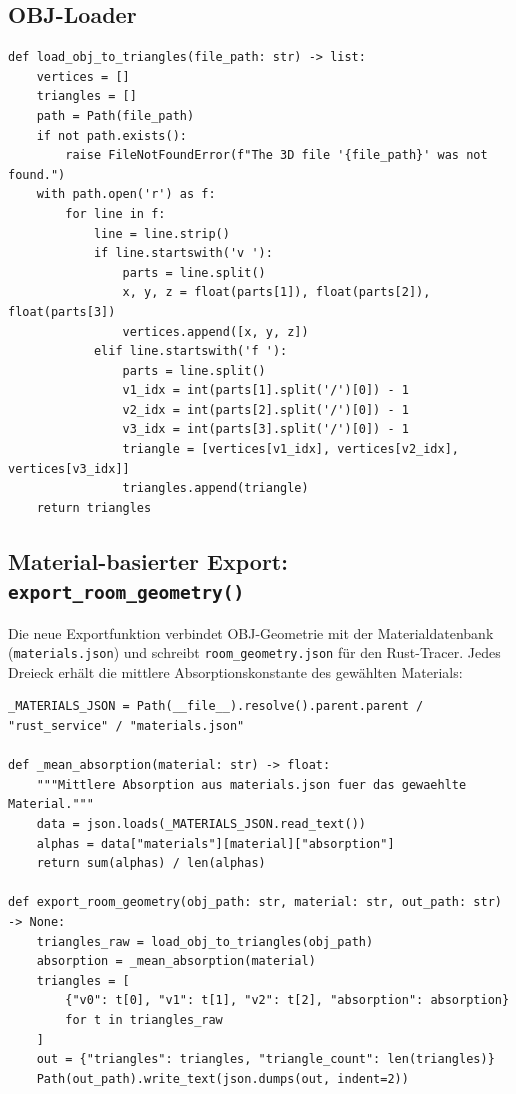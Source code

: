 \documentclass[11pt,a4paper,twoside]{report}
\begin{document}
\subsection{OBJ-Loader}

\begin{lstlisting}
def load_obj_to_triangles(file_path: str) -> list:
    vertices = []
    triangles = []
    path = Path(file_path)
    if not path.exists():
        raise FileNotFoundError(f"The 3D file '{file_path}' was not found.")
    with path.open('r') as f:
        for line in f:
            line = line.strip()
            if line.startswith('v '):
                parts = line.split()
                x, y, z = float(parts[1]), float(parts[2]), float(parts[3])
                vertices.append([x, y, z])
            elif line.startswith('f '):
                parts = line.split()
                v1_idx = int(parts[1].split('/')[0]) - 1
                v2_idx = int(parts[2].split('/')[0]) - 1
                v3_idx = int(parts[3].split('/')[0]) - 1
                triangle = [vertices[v1_idx], vertices[v2_idx], vertices[v3_idx]]
                triangles.append(triangle)
    return triangles
\end{lstlisting}

\subsection{Material-basierter Export: \texttt{export\_room\_geometry()}}

Die neue Exportfunktion verbindet OBJ-Geometrie mit der Materialdatenbank
(\texttt{materials.json}) und schreibt \texttt{room\_geometry.json} f\"ur den Rust-Tracer.
Jedes Dreieck erh\"alt die mittlere Absorptionskonstante des gew\"ahlten Materials:

\begin{lstlisting}
_MATERIALS_JSON = Path(__file__).resolve().parent.parent / "rust_service" / "materials.json"

def _mean_absorption(material: str) -> float:
    """Mittlere Absorption aus materials.json fuer das gewaehlte Material."""
    data = json.loads(_MATERIALS_JSON.read_text())
    alphas = data["materials"][material]["absorption"]
    return sum(alphas) / len(alphas)

def export_room_geometry(obj_path: str, material: str, out_path: str) -> None:
    triangles_raw = load_obj_to_triangles(obj_path)
    absorption = _mean_absorption(material)
    triangles = [
        {"v0": t[0], "v1": t[1], "v2": t[2], "absorption": absorption}
        for t in triangles_raw
    ]
    out = {"triangles": triangles, "triangle_count": len(triangles)}
    Path(out_path).write_text(json.dumps(out, indent=2))
\end{lstlisting}
\end{document}
